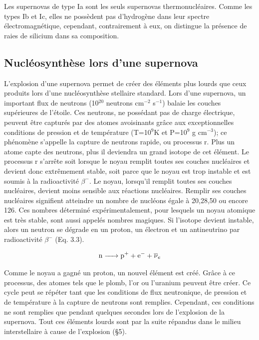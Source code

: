 Les supernovas de type Ia sont les seuls supernovas thermonucléaires. Comme les types Ib et Ic, elles ne possèdent pas d'hydrogène dans leur spectre électromagnétique, cependant, contrairement à eux, on distingue la présence de raies de silicium dans sa composition. \bigskip
 
 \subsection{Nucléosynthèse lors d'une supernova} \medskip
 
 L'explosion d'une supernova permet de créer des éléments plus lourds que ceux produits lors d'une nucléosynthèse stellaire standard. Lors d'une supernova, un important flux de neutrons (10$^{20}$ neutrons cm$^{-2}$ s$^{-1}$) balaie les couches supérieures de l'étoile. Ces neutrons, ne possédant pas de charge électrique, peuvent être capturés par des atomes avoisinants grâce aux exceptionnelles conditions de pression et de température (T=10$^{9}$K et P=10$^{9}$ g cm$^{-3}$); ce phénomène s'appelle la capture de neutrons rapide, ou processus r. %
 Plus un atome capte des neutrons, plus il deviendra un grand isotope de cet élément. Le processus r s'arrête soit lorsque le noyau remplit toutes ses couches nucléaires et devient donc extrêmement stable, soit parce que le noyau est trop instable et est soumis à la radioactivité $\beta^{-}$. \smallskip
 Le noyau, lorsqu'il remplit toutes ses couches nucléaires, devient moins sensible aux réactions nucléaires. Remplir ses couches nucléaires signifient atteindre un nombre de nucléons égale à 20,28,50 ou encore 126. Ces nombres déterminé expérimentalement, pour lesquels un noyau atomique est très stable, sont aussi appelés nombres magiques. \smallskip 
 Si l'isotope devient instable, alors un neutron se dégrade en un proton, un électron et un antineutrino  par radioactivité $\beta^{-}$ (Eq. 3.3). \bigskip
 
\begin{equation} \ce{n -> \ce{p+} + \ce{e-} + $\overline{\nu}$_{e}} \end{equation} \bigskip
 
 Comme le noyau a gagné un proton, un nouvel élément est créé. Grâce à ce processus, des atomes tels que le plomb, l'or ou l'uranium peuvent être créer. Ce cycle peut se répéter tant que les conditions de flux neutronique, de pression et de température à la capture de neutrons sont remplies. Cependant, ces conditions ne sont remplies que pendant quelques secondes lors de l'explosion de la supernova. Tout ces éléments lourds sont par la suite répandus dans le milieu interstellaire à cause de l'explosion (§5). \bigskip
 

